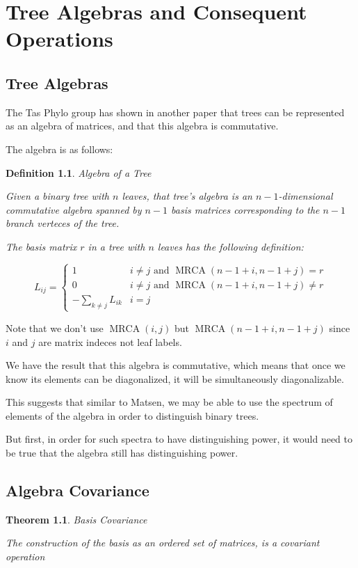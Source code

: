 \documentclass[10pt,a4paper]{report}
\DeclareMathOperator{\MRCA}{MRCA}
\newtheorem{definition}{Definition}
\newtheorem{theorem}{Theorem}
\begin{document}
\chapter{Tree Algebras and Consequent Operations}

\section{Tree Algebras}

The Tas Phylo group has shown in another paper that trees can be represented as
an algebra of matrices, and that this algebra is commutative.

The algebra is as follows:

\begin{definition} Algebra of a Tree

	Given a binary tree with $n$ leaves, that tree's algebra is an
	$n-1$-dimensional commutative algebra spanned by $n-1$ basis matrices
	corresponding to the $n-1$ branch verteces of the tree.

	The basis matrix $r$ in a tree with $n$ leaves has the following
	definition:

	\[ L_{ij} = \begin{cases}
		1 & i \neq j \textrm{ and } \MRCA(n-1+i, n-1+j) = r\\
		0 & i \neq j \textrm{ and } \MRCA(n-1+i, n-1+j) \neq r\\
		-\sum_{k \neq j} L_{ik} & i = j
	\end{cases} \]
\end{definition}

Note that we don't use $\MRCA(i, j)$ but $\MRCA(n-1+i, n-1+j)$ since $i$ and $j$ are matrix indeces not leaf labels.

We have the result that this algebra is commutative, which means that once we know its elements can be diagonalized, it will be simultaneously diagonalizable.

This suggests that similar to Matsen, we may be able to use the spectrum of elements of the algebra in order to distinguish binary trees.

But first, in order for such spectra to have distinguishing power, it would need to be true that the algebra still has distinguishing power.

\section{Algebra Covariance}

\begin{theorem} Basis Covariance

	The construction of the basis as an ordered set of matrices, is a covariant operation
\end{theorem}
\end{document}
